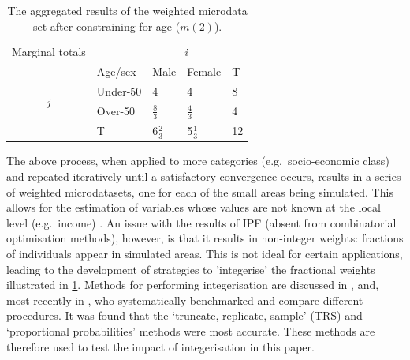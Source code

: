 \documentclass[a4paper,10pt]{article}
\begin{document}
\begin{table}[htbp]
\centering
\caption[Aggregated results after constraining for age]{The
aggregated results of the weighted
microdata set after constraining for age ($m(2)$).
}

\begin{tabular}{cllll}\toprule
Marginal totals&  & \multicolumn{2}{c}{$i$} & \\
& Age/sex & Male & Female & T\\ \midrule
\multirow{2}{*}{$j$} & Under-50 & 4 & 4 & 8\\
& Over-50 & $\frac{8}{3}$ & $\frac{4}{3}$ & 4 \\
& T & $6\frac{2}{3}$ & 5$\frac{1}{3}$ & 12\\
\bottomrule
\end{tabular}
\label{t:m2}
\end{table}

The above process, when applied to more categories (e.g.~socio-economic class)
and repeated iteratively until a satisfactory convergence occurs, results in a
series of weighted microdatasets, one for each of the small areas being
simulated. This allows for the estimation of variables whose values are not
known at the local level (e.g.~income) \citep{Ballas2005c}. An issue
with the results of IPF (absent from combinatorial optimisation methods),
however, is that it results in non-integer weights: fractions of individuals
appear in simulated areas. This is not ideal
for certain applications, leading to the development of strategies
to 'integerise' the fractional weights illustrated in \cref{t:m2}.
Methods for performing integerisation are discussed in
\citep{Ballas2005c}, \citep{Pritchard2012} and, most recently
in \citep{Lovelace2013-trs}, who
systematically benchmarked and compare different procedures.
It was found that the `truncate, replicate, sample' (TRS)
and `proportional probabilities' methods were most accurate.
These methods are therefore used to test the impact of
integerisation in this paper.

\end{document}
